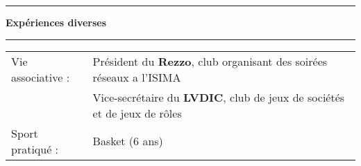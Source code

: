 \documentclass[a4paper,11pt]{article}
\newcommand{\titre}[1]{%
	\begin{center}
	\bigskip
	\rule{\textwidth}{1pt}
	\par\vspace{0.1cm}
        \textbf{\LARGE #1}
	\par\rule{\textwidth}{1pt}
	\end{center}
	\bigskip
}
\begin{document}
\titre{Expériences diverses}
\begin{tabular}{ll}
Vie associative :& Président du \textbf{Rezzo}, club organisant des soirées réseaux a l'ISIMA \\
& Vice-secrétaire du \textbf{LVDIC}, club de jeux de sociétés et de jeux de rôles \\
Sport pratiqué :& Basket (6 ans)
\end{tabular}
\end{document}
